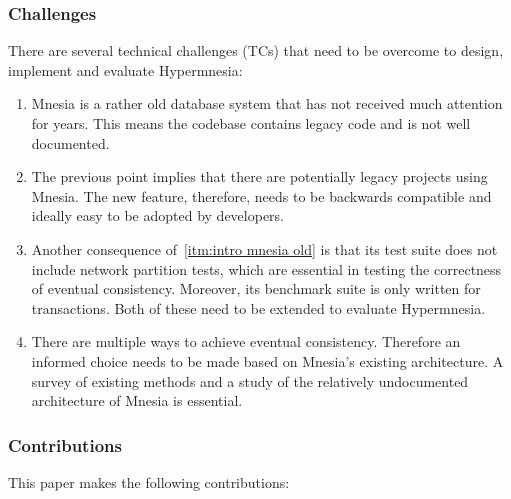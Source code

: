 \subsubsection*{Challenges}

There are several technical challenges (TCs) that need to be overcome to design,
implement and evaluate Hypermnesia:

\begin{enumerate}[label={TC\arabic*.}, ref={TC\arabic*}]
  \item Mnesia is a rather old database system that has not received much attention for
  years. This means the codebase contains legacy code and is not well documented.
  \label{itm:intro mnesia old}
  \item The previous point implies that there are potentially legacy projects
  using Mnesia. The new feature, therefore, needs to be backwards compatible and 
  ideally easy to be adopted by developers.
  \item Another consequence of~\cref{itm:intro mnesia old} is that its test
  suite does not include network partition tests, which are essential in testing
  the correctness of eventual consistency. Moreover, its benchmark suite is only
  written for transactions. Both of these need to be extended to evaluate Hypermnesia.
  \item There are multiple ways to achieve eventual consistency. Therefore an
  informed choice needs to be made based on Mnesia's existing architecture. A survey 
  of existing methods and a study of the
  relatively undocumented architecture of Mnesia is essential.
\end{enumerate}


\subsubsection*{Contributions} This paper makes the following contributions:

